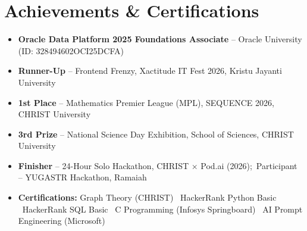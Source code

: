 \documentclass[10pt,a4paper]{article}
\begin{document}
\section*{Achievements \& Certifications}
\begin{itemize}
  \item \textbf{Oracle Data Platform 2025 Foundations Associate} -- Oracle University (ID: 328494602OCI25DCFA)
  \item \textbf{Runner-Up} -- Frontend Frenzy, Xactitude IT Fest 2026, Kristu Jayanti University
  \item \textbf{1st Place} -- Mathematics Premier League (MPL), SEQUENCE 2026, CHRIST University
  \item \textbf{3rd Prize} -- National Science Day Exhibition, School of Sciences, CHRIST University
  \item \textbf{Finisher} -- 24-Hour Solo Hackathon, CHRIST $\times$ Pod.ai (2026);\
        Participant -- YUGASTR Hackathon, Ramaiah
  \item \textbf{Certifications:} Graph Theory (CHRIST) \textbullet\ HackerRank Python Basic \textbullet\ HackerRank SQL Basic
        \textbullet\ C Programming (Infosys Springboard) \textbullet\ AI Prompt Engineering (Microsoft)
\end{itemize}
\end{document}
